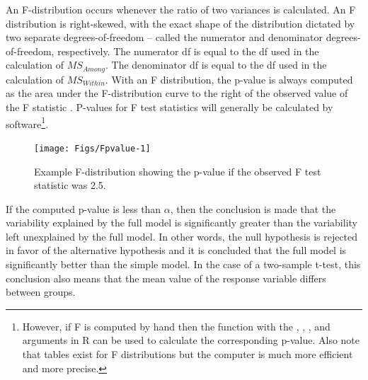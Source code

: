 \documentclass[10pt,openany]{book}\usepackage[]{graphicx}\usepackage[]{color}
\newenvironment{knitrout}{}{} %
\begin{document}
An F-distribution occurs whenever the ratio of two variances is calculated.  An F distribution  is right-skewed, with the exact shape of the distribution dictated by two separate degrees-of-freedom -- called the numerator and denominator degrees-of-freedom, respectively.  The numerator df is equal to the df used in the calculation of $MS_{Among}$.  The denominator df is equal to the df used in the calculation of $MS_{Within}$.  With an F distribution, the p-value is always computed as the area under the F-distribution curve to the right of the observed value of the F statistic .   P-values for F test statistics will generally be calculated by software\footnote{However, if F is computed by hand then the  function with the , , , and  arguments in R can be used to calculate the corresponding p-value.  Also note that tables exist for F distributions but the computer is much more efficient and more precise.}.

\begin{knitrout}
\color{fgcolor}\begin{figure}[!h]

{\centering \texttt{[image: Figs/Fpvalue-1]} 

}

\caption[Example F-distribution showing the p-value if the observed F test statistic was 2]{Example F-distribution showing the p-value if the observed F test statistic was 2.5.}\label{fig:Fpvalue}
\end{figure}


\end{knitrout}


\vspace{-12pt}

\vspace{-12pt}

If the computed p-value is less than $\alpha$, then the conclusion is made that the variability explained by the full model is significantly greater than the variability left unexplained by the full model.  In other words, the null hypothesis is rejected in favor of the alternative hypothesis and it is concluded that the full model is significantly better than the simple model.  In the case of a two-sample t-test, this conclusion also means that the mean value of the response variable differs between groups.
\end{document}

